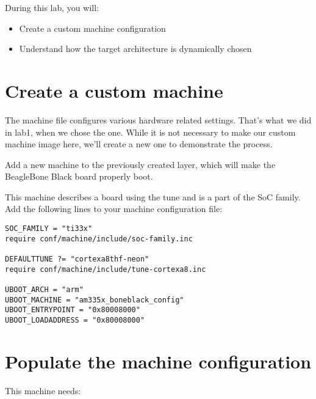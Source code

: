 
During this lab, you will:
\begin{itemize}
  \item Create a custom machine configuration
  \item Understand how the target architecture is dynamically chosen
\end{itemize}

\section{Create a custom machine}

The machine file configures various hardware related settings. That's
what we did in lab1, when we chose the  one. While it
is not necessary to make our custom machine image here, we'll create a
new one to demonstrate the process.

Add a new  machine to the previously created layer, which
will make the BeagleBone Black board properly boot.

This machine describes a board using the  tune
and is a part of the  SoC family. Add the following lines
to your machine configuration file:

\begin{verbatim}
SOC_FAMILY = "ti33x"
require conf/machine/include/soc-family.inc

DEFAULTTUNE ?= "cortexa8thf-neon"
require conf/machine/include/tune-cortexa8.inc

UBOOT_ARCH = "arm"
UBOOT_MACHINE = "am335x_boneblack_config"
UBOOT_ENTRYPOINT = "0x80008000"
UBOOT_LOADADDRESS = "0x80008000"
\end{verbatim}

\section{Populate the machine configuration}

This  machine needs:

